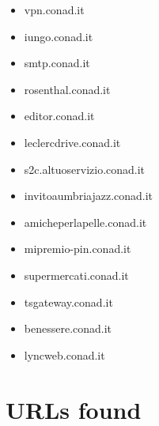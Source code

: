 \documentclass{article}
\begin{document}
\begin{itemize}
            \item vpn.conad.it
        
            \item iungo.conad.it
        
            \item smtp.conad.it
        
            \item rosenthal.conad.it
        
            \item editor.conad.it
        
            \item leclercdrive.conad.it
        
            \item s2c.altuoservizio.conad.it
        
            \item invitoaumbriajazz.conad.it
        
            \item amicheperlapelle.conad.it
        
            \item mipremio-pin.conad.it
        
            \item supermercati.conad.it
        
            \item tsgateway.conad.it
        
            \item benessere.conad.it
        
            \item lyncweb.conad.it
        
    
\end{itemize}

\clearpage


\section{URLs found}
\end{document}
